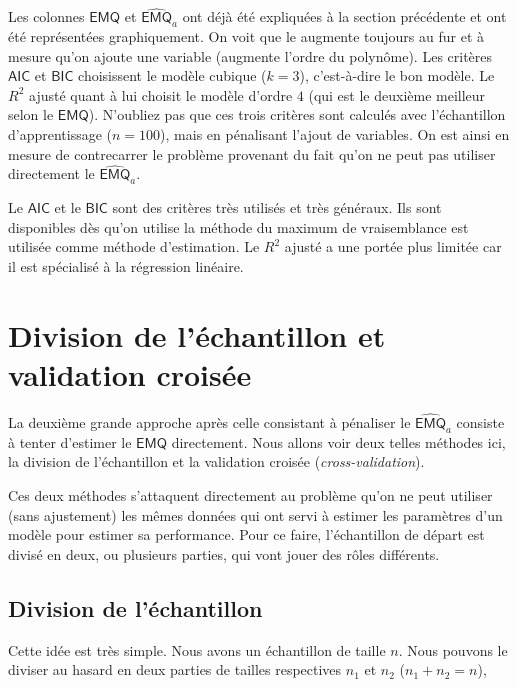 \documentclass[
  11pt,
  letterpaper,
]{book}
\theoremstyle{definition}
\theoremstyle{definition}
\theoremstyle{definition}
\theoremstyle{remark}
\begin{document}
Les colonnes \(\mathsf{EMQ}\) et \(\widehat{\mathsf{EMQ}}_a\) ont déjà été expliquées à la section précédente et ont été représentées graphiquement.
On voit que le augmente toujours au fur et à mesure qu'on ajoute une variable (augmente l'ordre du polynôme). Les critères \(\mathsf{AIC}\) et \(\mathsf{BIC}\) choisissent le modèle cubique (\(k=3\)), c'est-à-dire le bon modèle. Le \(R^2\) ajusté quant à lui choisit le modèle d'ordre \(4\) (qui est le deuxième meilleur selon le \(\mathsf{EMQ}\)). N'oubliez pas que ces trois critères sont calculés avec l'échantillon d'apprentissage (\(n=100\)), mais en pénalisant l'ajout de variables. On est ainsi en mesure de contrecarrer le problème provenant du fait qu'on ne peut pas utiliser directement le \(\widehat{\mathsf{EMQ}}_a\).

Le \(\mathsf{AIC}\) et le \(\mathsf{BIC}\) sont des critères très utilisés et très généraux. Ils sont disponibles dès qu'on utilise la méthode du maximum de vraisemblance est utilisée comme méthode d'estimation. Le \(R^2\) ajusté a une portée plus limitée car il est spécialisé à la régression linéaire.

\hypertarget{division-de-luxe9chantillon-et-validation-croisuxe9e}{%
\section{Division de l'échantillon et validation croisée}\label{division-de-luxe9chantillon-et-validation-croisuxe9e}}

La deuxième grande approche après celle consistant à pénaliser le \(\widehat{\mathsf{EMQ}}_a\) consiste à tenter d'estimer le \(\mathsf{EMQ}\) directement. Nous allons voir deux telles méthodes ici, la division de l'échantillon et la validation croisée (\emph{cross-validation}).

Ces deux méthodes s'attaquent directement au problème qu'on ne peut utiliser (sans ajustement) les mêmes données qui ont servi à estimer les paramètres d'un modèle pour estimer sa performance. Pour ce faire, l'échantillon de départ est divisé en deux, ou plusieurs parties, qui vont jouer des rôles différents.

\hypertarget{division-de-luxe9chantillon}{%
\subsection{Division de l'échantillon}\label{division-de-luxe9chantillon}}

Cette idée est très simple. Nous avons un échantillon de taille \(n\). Nous pouvons le diviser au hasard en deux parties de tailles respectives \(n_1\) et \(n_2\) (\(n_1+n_2=n\)),
\end{document}
